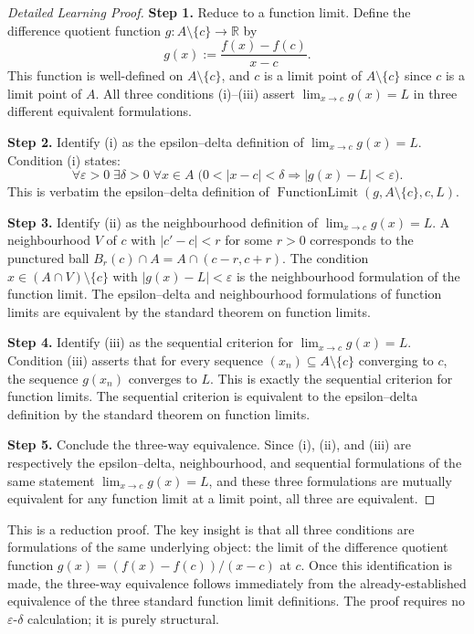 \begin{proof}[Detailed Learning Proof]
\LRAProofBodyStart

\textbf{Step 1.} Reduce to a function limit. Define the difference quotient function $g : A \setminus \{c\} \to \mathbb{R}$ by
\[
g(x) := \frac{f(x) - f(c)}{x - c}.
\]
This function is well-defined on $A \setminus \{c\}$, and $c$ is a limit point of $A \setminus \{c\}$ since $c$ is a limit point of $A$. All three conditions (i)--(iii) assert $\lim_{x \to c} g(x) = L$ in three different equivalent formulations.

\textbf{Step 2.} Identify (i) as the epsilon--delta definition of $\lim_{x \to c} g(x) = L$. Condition (i) states:
\[
\forall \varepsilon > 0\;\exists \delta > 0\;\forall x \in A\;\bigl(0 < |x-c| < \delta \Rightarrow |g(x) - L| < \varepsilon\bigr).
\]
This is verbatim the epsilon--delta definition of $\operatorname{FunctionLimit}(g, A\setminus\{c\}, c, L)$.

\textbf{Step 3.} Identify (ii) as the neighbourhood definition of $\lim_{x \to c} g(x) = L$. A neighbourhood $V$ of $c$ with $|c' - c| < r$ for some $r > 0$ corresponds to the punctured ball $B_r(c) \cap A = A \cap (c-r, c+r)$. The condition $x \in (A \cap V) \setminus \{c\}$ with $|g(x) - L| < \varepsilon$ is the neighbourhood formulation of the function limit. The epsilon--delta and neighbourhood formulations of function limits are equivalent by the standard theorem on function limits.

\textbf{Step 4.} Identify (iii) as the sequential criterion for $\lim_{x \to c} g(x) = L$. Condition (iii) asserts that for every sequence $(x_n) \subseteq A \setminus \{c\}$ converging to $c$, the sequence $g(x_n)$ converges to $L$. This is exactly the sequential criterion for function limits. The sequential criterion is equivalent to the epsilon--delta definition by the standard theorem on function limits.

\textbf{Step 5.} Conclude the three-way equivalence. Since (i), (ii), and (iii) are respectively the epsilon--delta, neighbourhood, and sequential formulations of the same statement $\lim_{x \to c} g(x) = L$, and these three formulations are mutually equivalent for any function limit at a limit point, all three are equivalent.
\end{proof}

\begin{remark*}
This is a reduction proof. The key insight is that all three conditions are formulations of the same underlying object: the limit of the difference quotient function $g(x) = (f(x)-f(c))/(x-c)$ at $c$. Once this identification is made, the three-way equivalence follows immediately from the already-established equivalence of the three standard function limit definitions. The proof requires no $\varepsilon$-$\delta$ calculation; it is purely structural.
\end{remark*}

